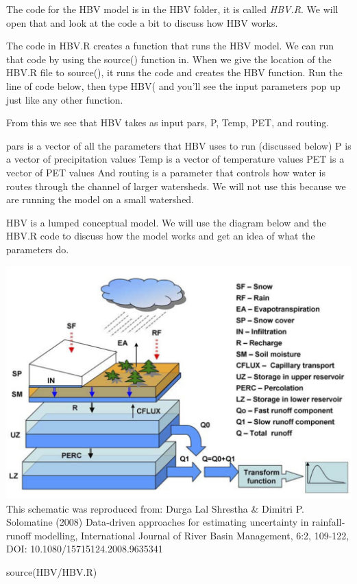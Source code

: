 \documentclass[
]{book}
\newenvironment{Shaded}{\begin{snugshade}}{\end{snugshade}}
\newcommand{\FunctionTok}[1]{\textcolor[rgb]{0.00,0.00,0.00}{#1}}
\newcommand{\NormalTok}[1]{#1}
\newcommand{\StringTok}[1]{\textcolor[rgb]{0.31,0.60,0.02}{#1}}
\begin{document}
The code for the HBV model is in the HBV folder, it is called \emph{HBV.R}. We will open that and look at the code a bit to discuss how HBV works.

The code in HBV.R creates a function that runs the HBV model. We can run that code by using the source() function in. When we give the location of the HBV.R file to source(), it runs the code and creates the HBV function. Run the line of code below, then type HBV( and you'll see the input parameters pop up just like any other function.

From this we see that HBV takes as input pars, P, Temp, PET, and routing.

pars is a vector of all the parameters that HBV uses to run (discussed below)
P is a vector of precipitation values
Temp is a vector of temperature values
PET is a vector of PET values
And routing is a parameter that controls how water is routes through the channel of larger watersheds. We will not use this because we are running the model on a small watershed.

HBV is a lumped conceptual model. We will use the diagram below and the HBV.R code to discuss how the model works and get an idea of what the parameters do.

\includegraphics{images/HBV-schem-Shrestha-Solomantine-2008.png}
This schematic was reproduced from: Durga Lal Shrestha \& Dimitri P. Solomatine (2008) Data‐driven approaches for estimating uncertainty in rainfall‐runoff modelling, International Journal of River Basin Management, 6:2, 109-122, DOI: 10.1080/15715124.2008.9635341

\begin{Shaded}
\begin{Highlighting}[]
\FunctionTok{source}\NormalTok{(}\StringTok{\textquotesingle{}HBV/HBV.R\textquotesingle{}}\NormalTok{)}
\end{Highlighting}
\end{Shaded}
\end{document}
